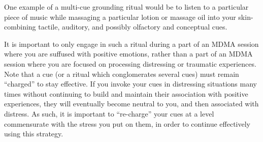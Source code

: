 \documentclass[12pt,letterpaper]{article}
\begin{document}
One example of a multi-cue grounding ritual would be to listen to a particular piece of music while massaging a particular lotion or massage oil into your skin-combining tactile, auditory, and possibly olfactory and conceptual cues.

It is important to only engage in such a ritual during a part of an MDMA session where you are suffused with positive emotions, rather than a part of an MDMA session where you are focused on processing distressing or traumatic experiences. Note that a cue (or a ritual which conglomerates several cues) must remain “charged” to stay effective. If you invoke your cues in distressing situations many times without continuing to build and maintain their association with positive experiences, they will eventually become neutral to you, and then associated with distress. As such, it is important to “re-charge” your cues at a level commensurate with the stress you put on them, in order to continue effectively using this strategy.
\end{document}
